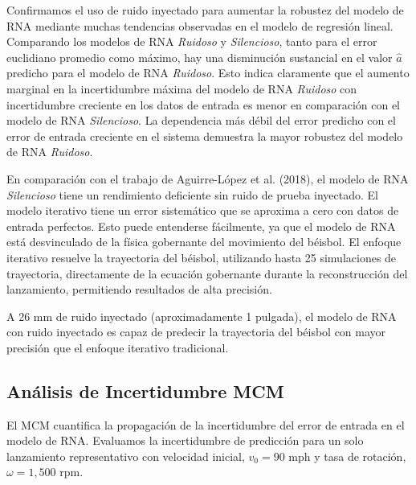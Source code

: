 \documentclass[12pt,a4paper]{article}
\begin{document}
Confirmamos el uso de ruido inyectado para aumentar la robustez del modelo de RNA mediante muchas tendencias observadas en el modelo de regresión lineal. Comparando los modelos de RNA \textit{Ruidoso} y \textit{Silencioso}, tanto para el error euclidiano promedio como máximo, hay una disminución sustancial en el valor $\hat{a}$ predicho para el modelo de RNA \textit{Ruidoso}. Esto indica claramente que el aumento marginal en la incertidumbre máxima del modelo de RNA \textit{Ruidoso} con incertidumbre creciente en los datos de entrada es menor en comparación con el modelo de RNA \textit{Silencioso}. La dependencia más débil del error predicho con el error de entrada creciente en el sistema demuestra la mayor robustez del modelo de RNA \textit{Ruidoso}.

En comparación con el trabajo de Aguirre-López et al. (2018), el modelo de RNA \textit{Silencioso} tiene un rendimiento deficiente sin ruido de prueba inyectado. El modelo iterativo tiene un error sistemático que se aproxima a cero con datos de entrada perfectos. Esto puede entenderse fácilmente, ya que el modelo de RNA está desvinculado de la física gobernante del movimiento del béisbol. El enfoque iterativo resuelve la trayectoria del béisbol, utilizando hasta 25 simulaciones de trayectoria, directamente de la ecuación gobernante durante la reconstrucción del lanzamiento, permitiendo resultados de alta precisión.

A 26 mm de ruido inyectado (aproximadamente 1 pulgada), el modelo de RNA con ruido inyectado es capaz de predecir la trayectoria del béisbol con mayor precisión que el enfoque iterativo tradicional.

\subsection{Análisis de Incertidumbre MCM}

El MCM cuantifica la propagación de la incertidumbre del error de entrada en el modelo de RNA. Evaluamos la incertidumbre de predicción para un solo lanzamiento representativo con velocidad inicial, $v_0 = 90$ mph y tasa de rotación, $\omega = 1,500$ rpm.
\end{document}
